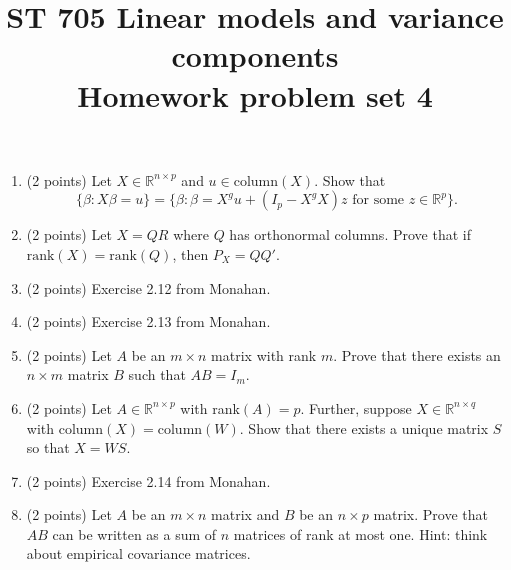 \documentclass[11pt]{article}
\title{ST 705 Linear models and variance components \\ 
        Homework problem set 4}
\begin{document}
\maketitle

\begin{enumerate}

\item(2 points) Let $X \in \mathbb{R}^{n\times p}$ and $u \in \text{column}(X)$.  Show that 
\[
\{\beta : X\beta = u\} = \{\beta : \beta = X^{g}u + (I_{p} - X^{g}X)z \text{ for some } z \in \mathbb{R}^{p}\}.
\]

\item(2 points) Let $X = QR$ where $Q$ has orthonormal columns.  Prove that if $\text{rank}(X) = \text{rank}(Q)$, then $P_{X} = QQ'$.

\item(2 points) Exercise 2.12 from Monahan.

\item(2 points) Exercise 2.13 from Monahan.

\item(2 points) Let $A$ be an $m\times n$ matrix with rank $m$.  Prove that there exists an $n\times m$ matrix $B$ such that $AB = I_{m}$.

\item(2 points) Let $A \in \mathbb{R}^{n\times p}$ with rank$(A) = p$.  Further, suppose  $X \in \mathbb{R}^{n\times q}$ with $\text{column}(X) = \text{column}(W)$.  Show that there exists a unique matrix $S$ so that $X = WS$.

\item(2 points) Exercise 2.14 from Monahan.

\item(2 points) Let $A$ be an $m\times n$ matrix and $B$ be an $n\times p$ matrix.  Prove that $AB$ can be written as a sum of $n$ matrices of rank at most one.  Hint: think about empirical covariance matrices.

\end{enumerate}
\end{document}
